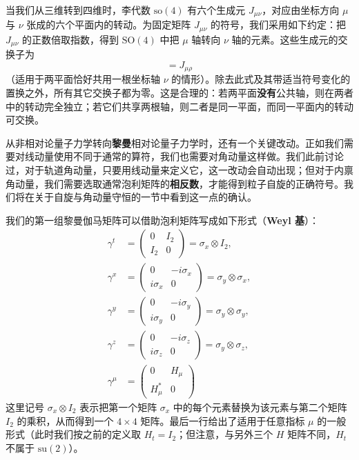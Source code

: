 当我们从三维转到四维时，李代数 $\mathrm{so}(4)$ 有六个生成元 $J_{\mu\nu}$，对应由坐标方向 $\mu$ 与 $\nu$ 张成的六个平面内的转动。为固定矩阵 $J_{\mu\nu}$ 的符号，我们采用如下约定：把 $J_{\mu\nu}$ 的正数倍取指数，得到 $\mathrm{SO}(4)$ 中把 $\mu$ 轴转向 $\nu$ 轴的元素。这些生成元的交换子为
\begin{equation}
[J_{\mu\nu},J_{\rho\nu}]=J_{\mu\rho}
\end{equation}
（适用于两平面恰好共用一根坐标轴 $\nu$ 的情形）。除去此式及其带适当符号变化的置换之外，所有其它交换子都为零。这是合理的：若两平面\textbf{没有}公共轴，则在两者中的转动完全独立；若它们共享两根轴，则二者是同一平面，而同一平面内的转动可交换。

从非相对论量子力学转向\textbf{黎曼}相对论量子力学时，还有一个关键改动。正如我们需要对线动量使用不同于通常的算符，我们也需要对角动量这样做。我们此前讨论过，对于轨道角动量，只要用线动量来定义它，这一改动会自动出现；但对于内禀角动量，我们需要选取通常泡利矩阵的\textbf{相反数}，才能得到粒子自旋的正确符号。我们将在关于自旋与角动量守恒的一节中看到这一点的确认。

我们的第一组黎曼伽马矩阵可以借助泡利矩阵写成如下形式（\textbf{Weyl 基}）：
\begin{align}
\gamma^{t} &=
\begin{pmatrix}0&I_{2}\\ I_{2}&0\end{pmatrix}
=\sigma_{x}\otimes I_{2}, \nonumber\\
\gamma^{x} &=
\begin{pmatrix}0&-i\sigma_{x}\\ i\sigma_{x}&0\end{pmatrix}
=\sigma_{y}\otimes\sigma_{x}, \nonumber\\
\gamma^{y} &=
\begin{pmatrix}0&-i\sigma_{y}\\ i\sigma_{y}&0\end{pmatrix}
=\sigma_{y}\otimes\sigma_{y}, \nonumber\\
\gamma^{z} &=
\begin{pmatrix}0&-i\sigma_{z}\\ i\sigma_{z}&0\end{pmatrix}
=\sigma_{y}\otimes\sigma_{z}, \nonumber\\
\gamma^{\mu} &=
\begin{pmatrix}0&H_{\mu}\\ H_{\mu}^{*}&0\end{pmatrix}
\tag{Riemannian}
\end{align}
这里记号 $\sigma_{x}\otimes I_{2}$ 表示把第一个矩阵 $\sigma_{x}$ 中的每个元素替换为该元素与第二个矩阵 $I_{2}$ 的乘积，从而得到一个 $4\times4$ 矩阵。最后一行给出了适用于任意指标 $\mu$ 的一般形式（此时我们按之前的定义取 $H_{t}=I_{2}$；但注意，与另外三个 $H$ 矩阵不同，$H_{t}$ 不属于 $\mathrm{su}(2)$）。

